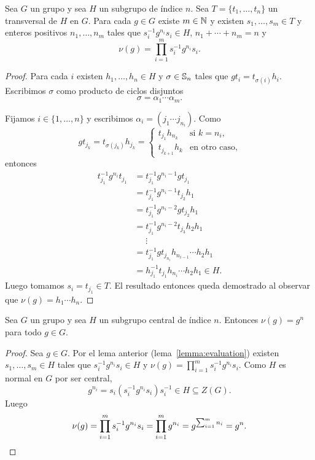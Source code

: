 
\begin{lemma}
	\label{lemma:evaluation}
	Sea $G$ un grupo y sea $H$ un subgrupo de índice $n$. Sea
	$T=\{t_1,\dots,t_n\}$ un transversal de $H$ en $G$.  Para cada $g\in G$ existe
	$m\in\mathbb{N}$ y 
	existen $s_{1},\dots,s_{m}\in T$ y enteros positivos $n_1,\dots,n_m$
	tales que 
	$s_i^{-1}g^{n_i}s_i\in H$,
	$n_1+\cdots+n_m=n$ y 
	\[
		\nu(g)=\prod_{i=1}^m s_i^{-1}g^{n_i}s_i.
	\]
\end{lemma}


\begin{proof}
	Para cada $i$ existen $h_1,\dots,h_n\in H$ y $\sigma\in\mathbb{S}_n$ tales que
	$gt_i=t_{\sigma(i)}h_i$. Escribimos $\sigma$ como producto de ciclos
	disjuntos
	\[
		\sigma=\alpha_1\cdots\alpha_m.
	\]

	Fijamos $i\in\{1,\dots,n\}$ y escribimos    
	$\alpha_i=(j_{1}\cdots j_{n_i})$. Como  
	\[
		g t_{j_k}=t_{\sigma(j_k)}h_{j_k}=\begin{cases}
			t_{j_1}h_{n_k} & \text{si $k=n_i$},\\
			t_{j_{k+1}}h_{k} & \text{en otro caso},
		\end{cases}
	\]
	entonces 
	\begin{align*}
	t_{j_1}^{-1}g^{n_i}t_{j_1}
	&=t_{j_1}^{-1}g^{n_i-1}gt_{j_1}\\
	&=t_{j_1}^{-1}g^{n_i-1}t_{j_2}h_1\\
	&=t_{j_1}^{-1}g^{n_i-2}gt_{j_2}h_1\\
	&=t_{j_1}^{-1}g^{n_i-2}t_{j_3}h_2h_1\\
	&\phantom{=}\vdots\\
	&=t_{j_1}^{-1}gt_{j_{n_i}}h_{n_{i-1}}\cdots h_2h_1\\
	&=h_{j_1}^{-1}t_{j_1}h_{n_i}\cdots h_2h_1\in H. 	
	\end{align*}
	Luego tomamos $s_i=t_{j_1}\in T$. El resultado
	entonces queda demostrado al observar que $\nu(g)=h_1\cdots h_n$. 
\end{proof}

\begin{proposition}
	\label{proposition:v(g)=g^n}
	Sea $G$ un grupo y sea $H$ un subgrupo central de índice $n$. 
	Entonces $\nu(g)=g^n$ para todo $g\in G$.
\end{proposition}

\begin{proof}
	Sea $g\in G$. Por el lema anterior (lema~\ref{lemma:evaluation}) existen $s_1,\dots,s_m\in
	H$ tales que $s_i^{-1}g^{n_i}s_i\in H$ y $\nu(g)=\prod_{i=1}^m
	s_i^{-1}g^{n_i}s_i$.  Como $H$ es normal en $G$ por ser central,
	\[
	g^{n_i}=s_i(s_i^{-1}g^{n_i}s_i)s_i^{-1}\in H\subseteq Z(G).
	\]
	Luego 
	\[
		\nu(g)
		=\prod_{i=1}^m s_i^{-1}g^{n_i}s_i
		=\prod_{i=1}^m g^{n_i}
		=g^{\sum_{i=1}^m n_i}
		=g^n.\qedhere 
	\]
\end{proof}

